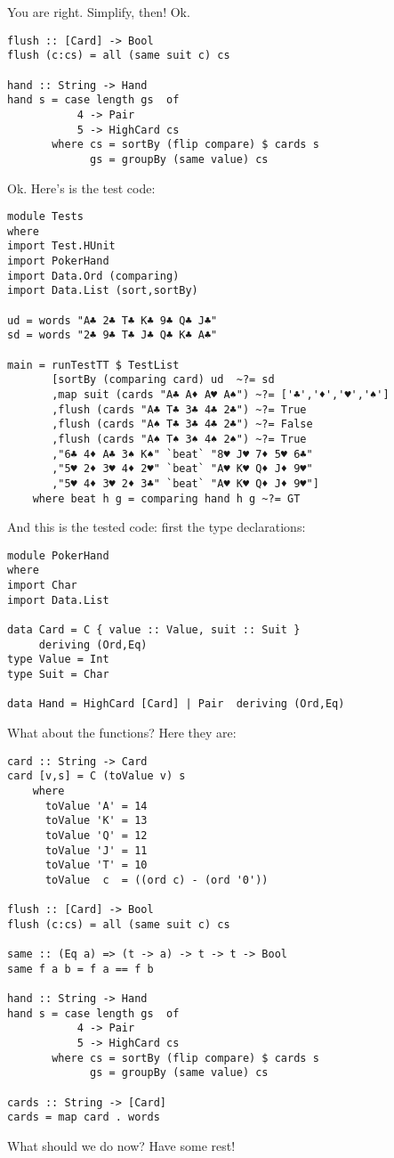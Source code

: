 \success You are right.
\lhN Simplify, then!
\lhA Ok. \begin{lstlisting}[frame=single]
flush :: [Card] -> Bool
flush (c:cs) = all (same suit c) cs

hand :: String -> Hand
hand s = case length gs  of
           4 -> Pair
           5 -> HighCard cs 
       where cs = sortBy (flip compare) $ cards s
             gs = groupBy (same value) cs
\end{lstlisting} %
\lhN Ok. Here's is the test code:
\begin{lstlisting}[frame=single]
module Tests
where 
import Test.HUnit
import PokerHand
import Data.Ord (comparing)
import Data.List (sort,sortBy)

ud = words "A♣ 2♣ T♣ K♣ 9♣ Q♣ J♣"
sd = words "2♣ 9♣ T♣ J♣ Q♣ K♣ A♣"

main = runTestTT $ TestList 
       [sortBy (comparing card) ud  ~?= sd
       ,map suit (cards "A♣ A♦ A♥ A♠") ~?= ['♣','♦','♥','♠']
       ,flush (cards "A♣ T♣ 3♣ 4♣ 2♣") ~?= True
       ,flush (cards "A♠ T♣ 3♣ 4♣ 2♣") ~?= False
       ,flush (cards "A♠ T♠ 3♠ 4♠ 2♠") ~?= True
       ,"6♣ 4♦ A♣ 3♠ K♠" `beat` "8♥ J♥ 7♦ 5♥ 6♣"
       ,"5♥ 2♦ 3♥ 4♦ 2♥" `beat` "A♥ K♥ Q♦ J♦ 9♥"
       ,"5♥ 4♦ 3♥ 2♦ 3♣" `beat` "A♥ K♥ Q♦ J♦ 9♥"]
    where beat h g = comparing hand h g ~?= GT
\end{lstlisting} %
\hspace*{\fill}
\lhA \success And this is the tested code: first the type declarations:
\begin{lstlisting}[frame=single]
module PokerHand
where
import Char
import Data.List

data Card = C { value :: Value, suit :: Suit } 
     deriving (Ord,Eq)
type Value = Int
type Suit = Char

data Hand = HighCard [Card] | Pair  deriving (Ord,Eq)
\end{lstlisting}
\newpage
\lhN What about the functions?
\lhA Here they are:
\begin{lstlisting}[frame=single]
card :: String -> Card
card [v,s] = C (toValue v) s
    where 
      toValue 'A' = 14
      toValue 'K' = 13
      toValue 'Q' = 12
      toValue 'J' = 11
      toValue 'T' = 10
      toValue  c  = ((ord c) - (ord '0'))

flush :: [Card] -> Bool
flush (c:cs) = all (same suit c) cs

same :: (Eq a) => (t -> a) -> t -> t -> Bool
same f a b = f a == f b

hand :: String -> Hand
hand s = case length gs  of
           4 -> Pair
           5 -> HighCard cs 
       where cs = sortBy (flip compare) $ cards s
             gs = groupBy (same value) cs

cards :: String -> [Card]
cards = map card . words 
\end{lstlisting} %
\lhN What should we do now?
\lhA Have some rest!
\lhend


